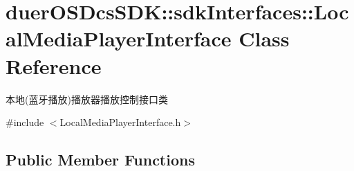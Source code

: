 \hypertarget{classduerOSDcsSDK_1_1sdkInterfaces_1_1LocalMediaPlayerInterface}{}\section{duer\+O\+S\+Dcs\+S\+DK\+:\+:sdk\+Interfaces\+:\+:Local\+Media\+Player\+Interface Class Reference}
\label{classduerOSDcsSDK_1_1sdkInterfaces_1_1LocalMediaPlayerInterface}


本地(蓝牙播放)播放器播放控制接口类  




{\ttfamily \#include $<$Local\+Media\+Player\+Interface.\+h$>$}

\subsection*{Public Member Functions}
